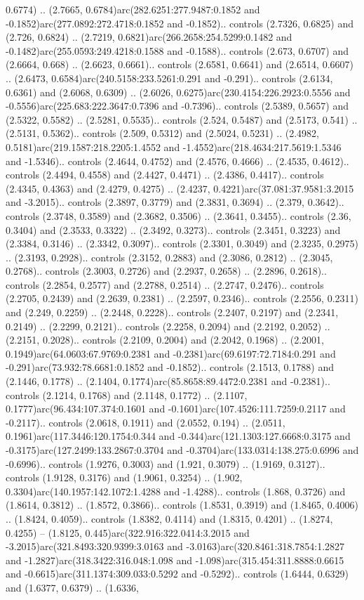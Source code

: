 0.6774) .. (2.7665, 0.6784)arc(282.6251:277.9487:0.1852 and -0.1852)arc(277.0892:272.4718:0.1852 and -0.1852).. controls (2.7326, 0.6825) and (2.726, 0.6824) .. (2.7219, 0.6821)arc(266.2658:254.5299:0.1482 and -0.1482)arc(255.0593:249.4218:0.1588 and -0.1588).. controls (2.673, 0.6707) and (2.6664, 0.668) .. (2.6623, 0.6661).. controls (2.6581, 0.6641) and (2.6514, 0.6607) .. (2.6473, 0.6584)arc(240.5158:233.5261:0.291 and -0.291).. controls (2.6134, 0.6361) and (2.6068, 0.6309) .. (2.6026, 0.6275)arc(230.4154:226.2923:0.5556 and -0.5556)arc(225.683:222.3647:0.7396 and -0.7396).. controls (2.5389, 0.5657) and (2.5322, 0.5582) .. (2.5281, 0.5535).. controls (2.524, 0.5487) and (2.5173, 0.541) .. (2.5131, 0.5362).. controls (2.509, 0.5312) and (2.5024, 0.5231) .. (2.4982, 0.5181)arc(219.1587:218.2205:1.4552 and -1.4552)arc(218.4634:217.5619:1.5346 and -1.5346).. controls (2.4644, 0.4752) and (2.4576, 0.4666) .. (2.4535, 0.4612).. controls (2.4494, 0.4558) and (2.4427, 0.4471) .. (2.4386, 0.4417).. controls (2.4345, 0.4363) and (2.4279, 0.4275) .. (2.4237, 0.4221)arc(37.081:37.9581:3.2015 and -3.2015).. controls (2.3897, 0.3779) and (2.3831, 0.3694) .. (2.379, 0.3642).. controls (2.3748, 0.3589) and (2.3682, 0.3506) .. (2.3641, 0.3455).. controls (2.36, 0.3404) and (2.3533, 0.3322) .. (2.3492, 0.3273).. controls (2.3451, 0.3223) and (2.3384, 0.3146) .. (2.3342, 0.3097).. controls (2.3301, 0.3049) and (2.3235, 0.2975) .. (2.3193, 0.2928).. controls (2.3152, 0.2883) and (2.3086, 0.2812) .. (2.3045, 0.2768).. controls (2.3003, 0.2726) and (2.2937, 0.2658) .. (2.2896, 0.2618).. controls (2.2854, 0.2577) and (2.2788, 0.2514) .. (2.2747, 0.2476).. controls (2.2705, 0.2439) and (2.2639, 0.2381) .. (2.2597, 0.2346).. controls (2.2556, 0.2311) and (2.249, 0.2259) .. (2.2448, 0.2228).. controls (2.2407, 0.2197) and (2.2341, 0.2149) .. (2.2299, 0.2121).. controls (2.2258, 0.2094) and (2.2192, 0.2052) .. (2.2151, 0.2028).. controls (2.2109, 0.2004) and (2.2042, 0.1968) .. (2.2001, 0.1949)arc(64.0603:67.9769:0.2381 and -0.2381)arc(69.6197:72.7184:0.291 and -0.291)arc(73.932:78.6681:0.1852 and -0.1852).. controls (2.1513, 0.1788) and (2.1446, 0.1778) .. (2.1404, 0.1774)arc(85.8658:89.4472:0.2381 and -0.2381).. controls (2.1214, 0.1768) and (2.1148, 0.1772) .. (2.1107, 0.1777)arc(96.434:107.374:0.1601 and -0.1601)arc(107.4526:111.7259:0.2117 and -0.2117).. controls (2.0618, 0.1911) and (2.0552, 0.194) .. (2.0511, 0.1961)arc(117.3446:120.1754:0.344 and -0.344)arc(121.1303:127.6668:0.3175 and -0.3175)arc(127.2499:133.2867:0.3704 and -0.3704)arc(133.0314:138.275:0.6996 and -0.6996).. controls (1.9276, 0.3003) and (1.921, 0.3079) .. (1.9169, 0.3127).. controls (1.9128, 0.3176) and (1.9061, 0.3254) .. (1.902, 0.3304)arc(140.1957:142.1072:1.4288 and -1.4288).. controls (1.868, 0.3726) and (1.8614, 0.3812) .. (1.8572, 0.3866).. controls (1.8531, 0.3919) and (1.8465, 0.4006) .. (1.8424, 0.4059).. controls (1.8382, 0.4114) and (1.8315, 0.4201) .. (1.8274, 0.4255) -- (1.8125, 0.445)arc(322.916:322.0414:3.2015 and -3.2015)arc(321.8493:320.9399:3.0163 and -3.0163)arc(320.8461:318.7854:1.2827 and -1.2827)arc(318.3422:316.048:1.098 and -1.098)arc(315.454:311.8888:0.6615 and -0.6615)arc(311.1374:309.033:0.5292 and -0.5292).. controls (1.6444, 0.6329) and (1.6377, 0.6379) .. (1.6336, 